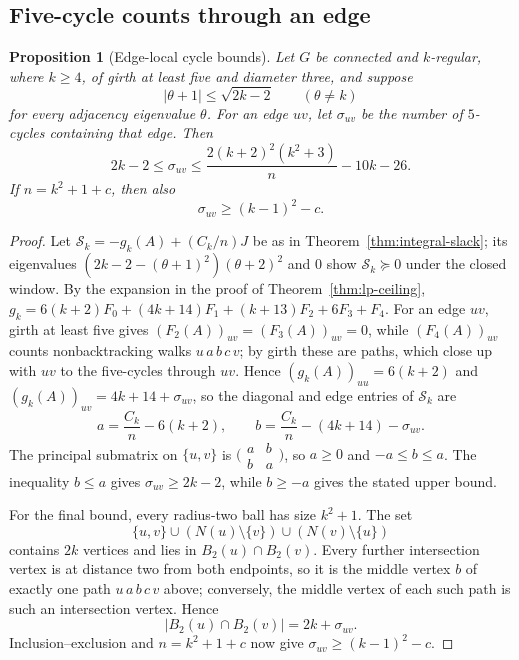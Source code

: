\documentclass[a4paper,10pt,reqno]{amsart}
\theoremstyle{plain}
\newtheorem{proposition}[theorem]{Proposition}
\theoremstyle{definition}
\theoremstyle{remark}
\begin{document}
\subsection{Five-cycle counts through an edge}

\begin{proposition}[Edge-local cycle bounds]\label{prop:edge-cycle}
Let \(G\) be connected and \(k\)-regular, where \(k\ge4\), of girth at least
five and diameter
three, and suppose
\[
 |\theta+1|\le\sqrt{2k-2}
 \qquad(\theta\ne k)
\]
for every adjacency eigenvalue \(\theta\).  For an edge \(uv\), let
\(\sigma_{uv}\) be the number of
\(5\)-cycles containing that edge.  Then
\[
 2k-2\le\sigma_{uv}\le
 \frac{2(k+2)^2(k^2+3)}n-10k-26.
\]
If \(n=k^2+1+c\), then also
\[
 \sigma_{uv}\ge(k-1)^2-c.
\]
\end{proposition}

\begin{proof}
Let \(\mathcal S_k=-g_k(A)+(C_k/n)J\) be as in
Theorem~\ref{thm:integral-slack}; its eigenvalues
\((2k-2-(\theta+1)^2)(\theta+2)^2\) and \(0\) show \(\mathcal S_k\succeq0\)
under the closed window. By the expansion in the proof of
Theorem~\ref{thm:lp-ceiling},
\(g_k=6(k+2)F_0+(4k+14)F_1+(k+13)F_2+6F_3+F_4\).
For an edge \(uv\), girth at least five gives
\((F_2(A))_{uv}=(F_3(A))_{uv}=0\), while \((F_4(A))_{uv}\) counts
nonbacktracking walks \(u\,a\,b\,c\,v\); by girth these are paths, which close
up with \(uv\) to the five-cycles through \(uv\).
Hence \((g_k(A))_{uu}=6(k+2)\) and \((g_k(A))_{uv}=4k+14+\sigma_{uv}\), so
the diagonal and edge entries of \(\mathcal S_k\) are
\[
 a=\frac{C_k}{n}-6(k+2),
 \qquad
 b=\frac{C_k}{n}-(4k+14)-\sigma_{uv}.
\]
The principal submatrix on \(\{u,v\}\) is
\(\bigl(\begin{smallmatrix}a&b\\b&a\end{smallmatrix}\bigr)\), so
\(a\ge0\) and \(-a\le b\le a\).  The inequality \(b\le a\) gives
\(\sigma_{uv}\ge2k-2\), while \(b\ge-a\) gives the stated upper bound.

For the final bound, every radius-two ball has size \(k^2+1\).  The set
\[
 \{u,v\}\cup(N(u)\setminus\{v\})\cup(N(v)\setminus\{u\})
\]
contains \(2k\) vertices and lies in \(B_2(u)\cap B_2(v)\).  Every further
intersection vertex is at distance two from both endpoints, so it is the
middle vertex \(b\) of exactly one path \(u\,a\,b\,c\,v\) above; conversely,
the middle vertex of each such path is such an intersection vertex.  Hence
\[
 |B_2(u)\cap B_2(v)|=2k+\sigma_{uv}.
\]
Inclusion--exclusion and \(n=k^2+1+c\) now give
\(\sigma_{uv}\ge(k-1)^2-c\).
\end{proof}
\end{document}
